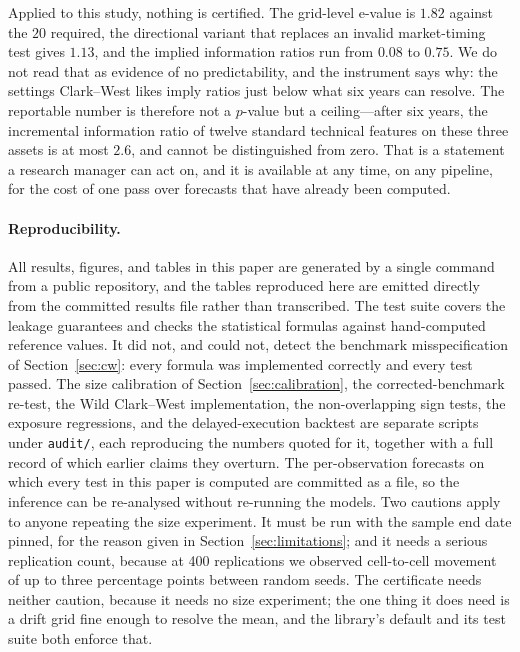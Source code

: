 \documentclass{article}
\theoremstyle{plain}
\theoremstyle{definition}
\begin{document}
Applied to this study, nothing is certified. The grid-level e-value is $1.82$ against the
$20$ required, the directional variant that replaces an invalid market-timing test gives
$1.13$, and the implied information ratios run from $0.08$ to $0.75$. We do not read that as
evidence of no predictability, and the instrument says why: the settings Clark--West likes
imply ratios just below what six years can resolve. The reportable number is therefore not a
$p$-value but a ceiling---after six years, the incremental information ratio of twelve
standard technical features on these three assets is at most $2.6$, and cannot be
distinguished from zero. That is a statement a research manager can act on, and it is
available at any time, on any pipeline, for the cost of one pass over forecasts that have
already been computed.

\paragraph{Reproducibility.} All results, figures, and tables in this paper are
generated by a single command from a public repository, and the tables reproduced
here are emitted directly from the committed results file rather than transcribed.
The test suite covers the leakage guarantees and checks the statistical formulas
against hand-computed reference values. It did not, and could not, detect the
benchmark misspecification of Section~\ref{sec:cw}: every formula was implemented
correctly and every test passed. The size calibration of
Section~\ref{sec:calibration}, the corrected-benchmark re-test, the Wild Clark--West
implementation, the non-overlapping sign tests, the exposure regressions, and the
delayed-execution backtest are separate scripts under \texttt{audit/}, each
reproducing the numbers quoted for it, together with a full record of which earlier
claims they overturn. The per-observation forecasts on which every test in this
paper is computed are committed as a file, so the inference can be re-analysed
without re-running the models. Two cautions apply to anyone repeating the size
experiment. It must be run with the sample end date pinned, for the reason given in
Section~\ref{sec:limitations}; and it needs a serious replication count, because at
400 replications we observed cell-to-cell movement of up to three percentage points
between random seeds. The certificate needs neither caution, because it needs no size
experiment; the one thing it does need is a drift grid fine enough to resolve the mean, and
the library's default and its test suite both enforce that.
\end{document}
